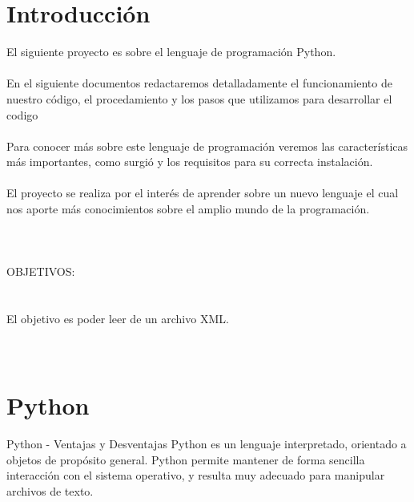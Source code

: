 \documentclass[11pt]{article} %
\begin{document}
\section{Introducción}
El siguiente proyecto es sobre el lenguaje de programación Python.\\ 
\\En el siguiente documentos redactaremos detalladamente el funcionamiento de nuestro código, el procedamiento y los pasos que utilizamos para desarrollar el codigo \\
\\Para conocer más sobre este lenguaje de programación veremos las características más importantes,  como surgió y los requisitos para su correcta instalación. \\
\\El proyecto se realiza por el interés de aprender sobre un nuevo lenguaje el cual nos aporte más conocimientos sobre el amplio mundo de la programación.\\
\\
\\ \\

OBJETIVOS:
\\ \\
\\El objetivo es poder leer de un archivo XML.\\\\\\

\section{Python}
Python - Ventajas y Desventajas
Python es un lenguaje interpretado, orientado a objetos de propósito general. Python permite mantener de forma sencilla interacción con el sistema operativo, y resulta muy adecuado para manipular archivos de texto. 
\newline
\\
\newline
\\
\end{document}
